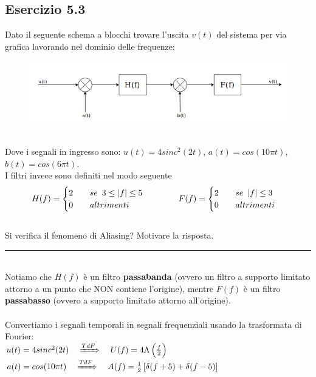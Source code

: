 \documentclass[12pt,a4paper]{article}
\begin{document}
	\subsection*{Esercizio 5.3} Dato il seguente schema a blocchi trovare l’uscita $v(t)$ del sistema per via grafica lavorando nel dominio delle frequenze:
	\begin{figure}[h!]
		\centering
		\includegraphics[scale=0.5]{./images/fourier31.png}
	\end{figure}
	\\Dove i segnali in ingresso sono: $u(t) = 4sinc^2(2t)$, $a(t) = cos(10\pi t)$, $b(t) = cos(6\pi t)$.\\I filtri invece sono definiti nel modo seguente
	\[
		H(f) = 
		\begin{cases}
		2\quad\quad se\hspace{5px}3 \leq |f| \leq 5\\
		0\quad\quad altrimenti
		\end{cases}
		\quad\quad\quad
		F(f) = 
		\begin{cases}
		2\quad\quad se \hspace{5px}|f| \leq 3\\
		0\quad\quad altrimenti
		\end{cases}
	\]
	\\Si verifica il fenomeno di Aliasing? Motivare la risposta.
	\par\noindent\rule{\textwidth}{0.4pt}
	\vspace{5mm}
	\\
	Notiamo che $H(f)$ è un filtro \textbf{passabanda} (ovvero un filtro a supporto limitato attorno a un punto che NON contiene l'origine), mentre $F(f)$ è un filtro \textbf{passabasso} (ovvero a supporto limitato attorno all'origine).\\ \\
	Convertiamo i segnali temporali in segnali frequenziali usando la trasformata di Fourier:\\
	$u(t) = 4sinc^2(2t)\quad\xRightarrow[]{TdF}\quad U(f) = 4\Lambda\left(\frac{f}{2}\right)$\\
	$a(t) = cos(10\pi t)\quad\xRightarrow[]{TdF}\quad A(f) = \frac{1}{2}\left[\delta(f+5) + \delta(f-5)\right]$\\
\end{document}

